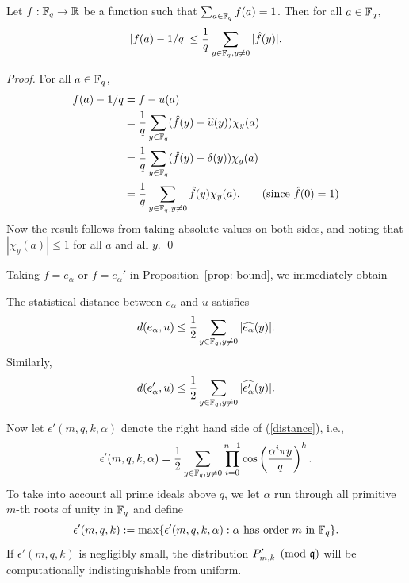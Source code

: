 \documentclass[envcountsect]{llncs}
\begin{document}
\begin{proposition} \label{prop: bound}
Let $f: \mathbb{F}_q \to \mathbb{R}$ be a function such that $\sum_{a \in \mathbb{F}_q} f(a) = 1$. Then for all $a \in \mathbb{F}_q$,
\begin{equation} \label{eq: secure}
    |f(a) -  1/q| \leq \frac{1}{q}  \sum_{y \in \mathbb{F}_q, y \neq 0}  |\hat{f}(y)|.
\end{equation}
\end{proposition}

\begin{proof} For all $a \in \mathbb{F}_q$,
\begin{align*}
    f(a) - 1/q &= f - u(a) \\
    & = \frac{1}{q} \sum_{y \in \mathbb{F}_q} (\hat{f}(y) - \widehat{u}(y) )\chi_y(a) \\
& = \frac{1}{q} \sum_{y \in \mathbb{F}_q} (\hat{f}(y)  - \delta(y) )\chi_y(a) \\
& = \frac{1}{q} \sum_{y \in \mathbb{F}_q, y \neq 0} \hat{f}(y)  \chi_y(a).  \qquad \mbox{(since $\hat{f}(0) = 1$)}
\end{align*}
Now the result follows from taking absolute values on both sides, and noting that $|\chi_y(a)| \leq 1$ for all $a$ and all $y$. 
\qed \end{proof}

Taking $f = e_\alpha$ or $f = e_\alpha'$ in Proposition~\ref{prop: bound}, we immediately obtain
\begin{theorem} \label{cor: stat dist}
The statistical distance between $e_\alpha$ and $u$ satisfies $$d(e_\alpha,u) \leq \frac{1}{2}  \sum_{y \in \mathbb{F}_q, y \neq 0}  |\widehat{e_\alpha}(y)|.$$
Similarly,
\begin{equation} \label{distance}
d(e_\alpha',u) \leq \frac{1}{2}  \sum_{y \in \mathbb{F}_q, y \neq 0}  |\widehat{e'_\alpha}(y)|.
\end{equation}
\end{theorem}



Now let $\epsilon'(m,q,k,\alpha)$ denote the right hand side of (\ref{distance}), i.e.,
\[
    \epsilon'(m,q,k, \alpha) = \frac{1}{2}\sum_{y \in \mathbb{F}_q, y \neq 0} \prod_{i=0}^{n-1} \cos \left(\frac{ \alpha^i \pi y}{q} \right)^k.
\]
To take into account all prime ideals above $q$, we let $\alpha$ run through all primitive $m$-th roots of unity in $\mathbb{F}_q$ and define
$$\epsilon'(m,q,k) := \max \{\epsilon'(m,q,k,\alpha): \alpha \mbox{ has order } m \mbox{ in } \mathbb{F}_q\}.$$
If $\epsilon'(m,q,k)$ is negligibly small, the distribution $P'_{m,k} \pmod {\mathfrak{q}}$ will be computationally indistinguishable from uniform. 
\end{document}
